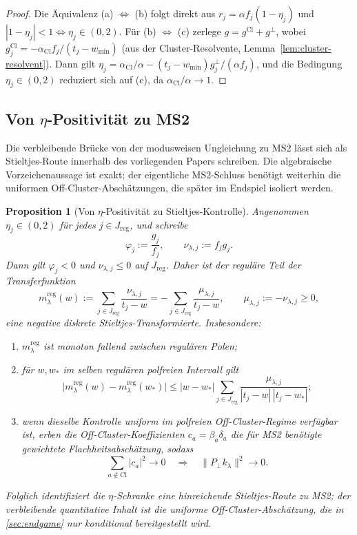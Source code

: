 \documentclass[12pt,a4paper]{article}
\newtheorem{proposition}[theorem]{Proposition}
\theoremstyle{definition}
\theoremstyle{remark}
\newcommand{\Cl}{\mathrm{Cl}}
\newcommand{\reg}{\mathrm{reg}}
\newcommand{\norm}[1]{\| #1 \|}
\newcommand{\wmin}{w_{\min}}
\begin{document}
\begin{proof}
Die Äquivalenz (a) $\Leftrightarrow$ (b) folgt direkt aus
$r_j = \alpha f_j(1 - \eta_j)$ und $|1 - \eta_j| < 1 \Leftrightarrow \eta_j \in (0,2)$.
Für (b) $\Leftrightarrow$ (c) zerlege $g = g^{\Cl} + g^\perp$, wobei
$g_j^{\Cl} = -\alpha_{\Cl} f_j / (t_j - \wmin)$
(aus der Cluster-Resolvente, Lemma~\ref{lem:cluster-resolvent}).
Dann gilt $\eta_j = \alpha_{\Cl}/\alpha - (t_j - \wmin) g_j^\perp / (\alpha f_j)$,
und die Bedingung $\eta_j \in (0,2)$ reduziert sich auf (c), da
$\alpha_{\Cl}/\alpha \to 1$.
\end{proof}

\subsection{Von \texorpdfstring{$\eta$}{eta}-Positivität zu MS2}

Die verbleibende Brücke von der modusweisen Ungleichung zu MS2 lässt sich
als Stieltjes-Route innerhalb des vorliegenden Papers schreiben. Die
algebraische Vorzeichenaussage ist exakt; der eigentliche MS2-Schluss
benötigt weiterhin die uniformen Off-Cluster-Abschätzungen, die später im
Endspiel isoliert werden.

\begin{proposition}[Von $\eta$-Positivität zu Stieltjes-Kontrolle]
\label{prop:eta-to-ms2}
Angenommen $\eta_j \in (0,2)$ für jedes $j \in J_{\reg}$, und schreibe
\[
  \varphi_j := \frac{g_j}{f_j},
  \qquad
  \nu_{\lambda,j} := f_j g_j.
\]
Dann gilt $\varphi_j < 0$ und $\nu_{\lambda,j} \le 0$ auf $J_{\reg}$.
Daher ist der reguläre Teil der Transferfunktion
\[
  m_\lambda^{\reg}(w)
  :=
  \sum_{j \in J_{\reg}} \frac{\nu_{\lambda,j}}{t_j-w}
  =
  - \sum_{j \in J_{\reg}} \frac{\mu_{\lambda,j}}{t_j-w},
  \qquad
  \mu_{\lambda,j} := - \nu_{\lambda,j} \ge 0,
\]
eine negative diskrete Stieltjes-Transformierte. Insbesondere:
\begin{enumerate}[label=(\roman*)]
\item $m_\lambda^{\reg}$ ist monoton fallend zwischen regulären Polen;
\item für $w,w_\ast$ im selben regulären polfreien Intervall gilt
\[
  \bigl|m_\lambda^{\reg}(w)-m_\lambda^{\reg}(w_\ast)\bigr|
  \le
  |w-w_\ast|
  \sum_{j\in J_{\reg}}
  \frac{\mu_{\lambda,j}}{|t_j-w|\,|t_j-w_\ast|};
\]
\item wenn dieselbe Kontrolle uniform im polfreien Off-Cluster-Regime
  verfügbar ist, erben die Off-Cluster-Koeffizienten
  $c_a = \beta_a\delta_a$ die für MS2 benötigte gewichtete
  Flachheitsabschätzung, sodass
\[
  \sum_{a\notin \Cl} |c_a|^2 \to 0
  \quad\Longrightarrow\quad
  \norm{P_\perp k_\lambda}^2 \to 0.
\]
\end{enumerate}
Folglich identifiziert die $\eta$-Schranke eine hinreichende
Stieltjes-Route zu MS2; der verbleibende quantitative Inhalt ist die
uniforme Off-Cluster-Abschätzung, die in \cref{sec:endgame} nur
konditional bereitgestellt wird.
\end{proposition}
\end{document}
